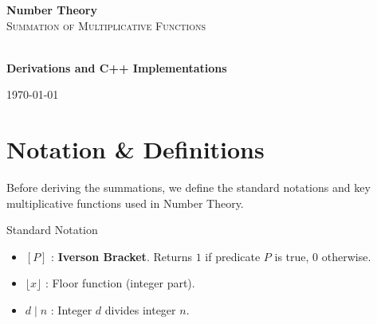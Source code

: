 \documentclass[11pt]{article}
\begin{document}
\begin{titlepage}

    \centering
    \vspace*{3cm}

    {\Huge \bfseries \color{primary} Number Theory}\\[0.5cm]
    {\Large \textsc{Summation of Multiplicative Functions}}\\[1cm]

    \\[1cm]

    {\large \textbf{Derivations and C++ Implementations}}\\[0.5cm]

    \vfill

    \today
\end{titlepage}

\tableofcontents
\clearpage


\section{Notation \& Definitions}
\label{sec:notation}

Before deriving the summations, we define the standard notations and key multiplicative functions used in Number Theory.

\begin{conceptbox}{Standard Notation}
    \begin{itemize}
        \item $[P]$ : \textbf{Iverson Bracket}. Returns $1$ if predicate $P$ is true, $0$ otherwise.
        \item $\lfloor x \rfloor$ : Floor function (integer part).
        \item $d \mid n$ : Integer $d$ divides integer $n$.
    \end{itemize}
\end{conceptbox}
\end{document}
